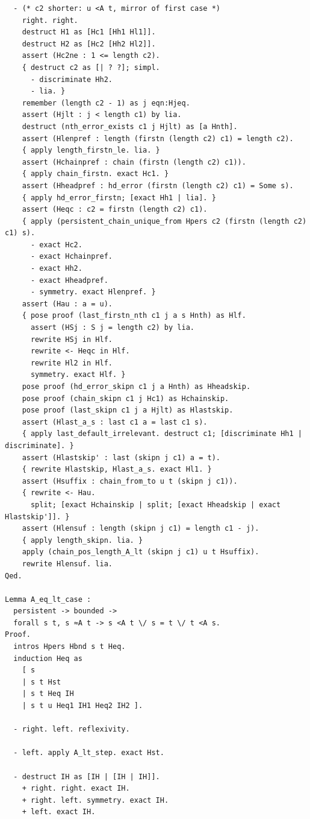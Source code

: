 \begin{latin}
\begin{verbatim}
  - (* c2 shorter: u <A t, mirror of first case *)
    right. right.
    destruct H1 as [Hc1 [Hh1 Hl1]].
    destruct H2 as [Hc2 [Hh2 Hl2]].
    assert (Hc2ne : 1 <= length c2).
    { destruct c2 as [| ? ?]; simpl.
      - discriminate Hh2.
      - lia. }
    remember (length c2 - 1) as j eqn:Hjeq.
    assert (Hjlt : j < length c1) by lia.
    destruct (nth_error_exists c1 j Hjlt) as [a Hnth].
    assert (Hlenpref : length (firstn (length c2) c1) = length c2).
    { apply length_firstn_le. lia. }
    assert (Hchainpref : chain (firstn (length c2) c1)).
    { apply chain_firstn. exact Hc1. }
    assert (Hheadpref : hd_error (firstn (length c2) c1) = Some s).
    { apply hd_error_firstn; [exact Hh1 | lia]. }
    assert (Heqc : c2 = firstn (length c2) c1).
    { apply (persistent_chain_unique_from Hpers c2 (firstn (length c2) c1) s).
      - exact Hc2.
      - exact Hchainpref.
      - exact Hh2.
      - exact Hheadpref.
      - symmetry. exact Hlenpref. }
    assert (Hau : a = u).
    { pose proof (last_firstn_nth c1 j a s Hnth) as Hlf.
      assert (HSj : S j = length c2) by lia.
      rewrite HSj in Hlf.
      rewrite <- Heqc in Hlf.
      rewrite Hl2 in Hlf.
      symmetry. exact Hlf. }
    pose proof (hd_error_skipn c1 j a Hnth) as Hheadskip.
    pose proof (chain_skipn c1 j Hc1) as Hchainskip.
    pose proof (last_skipn c1 j a Hjlt) as Hlastskip.
    assert (Hlast_a_s : last c1 a = last c1 s).
    { apply last_default_irrelevant. destruct c1; [discriminate Hh1 | discriminate]. }
    assert (Hlastskip' : last (skipn j c1) a = t).
    { rewrite Hlastskip, Hlast_a_s. exact Hl1. }
    assert (Hsuffix : chain_from_to u t (skipn j c1)).
    { rewrite <- Hau.
      split; [exact Hchainskip | split; [exact Hheadskip | exact Hlastskip']]. }
    assert (Hlensuf : length (skipn j c1) = length c1 - j).
    { apply length_skipn. lia. }
    apply (chain_pos_length_A_lt (skipn j c1) u t Hsuffix).
    rewrite Hlensuf. lia.
Qed.

Lemma A_eq_lt_case :
  persistent -> bounded ->
  forall s t, s ≈A t -> s <A t \/ s = t \/ t <A s.
Proof.
  intros Hpers Hbnd s t Heq.
  induction Heq as
    [ s
    | s t Hst
    | s t Heq IH
    | s t u Heq1 IH1 Heq2 IH2 ].

  - right. left. reflexivity.

  - left. apply A_lt_step. exact Hst.

  - destruct IH as [IH | [IH | IH]].
    + right. right. exact IH.
    + right. left. symmetry. exact IH.
    + left. exact IH.


\end{verbatim}
\end{latin}
